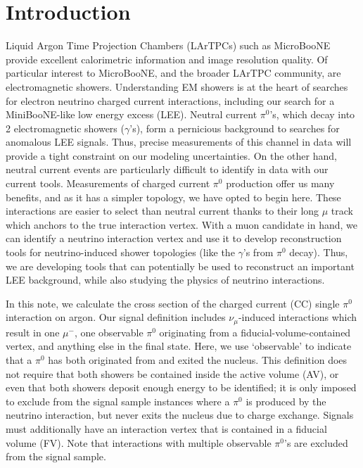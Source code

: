 \documentclass{article}
\begin{document}
\section{Introduction}
\label{sec:intro}
\par Liquid Argon Time Projection Chambers (LArTPCs) such as MicroBooNE provide excellent calorimetric information and image resolution quality. Of particular interest to MicroBooNE, and the broader LArTPC community, are electromagnetic showers.  Understanding EM showers is at the heart of searches for electron neutrino charged current interactions, including our search for a MiniBooNE-like low energy excess (LEE).  Neutral current $\pi^0$'s, which decay into 2 electromagnetic showers ($\gamma$'s), form a pernicious background to searches for anomalous LEE signals. Thus, precise measurements of this channel in data will provide a tight constraint on our modeling uncertainties. On the other hand, neutral current events are particularly difficult to identify in data with our current tools.  Measurements of charged current $\pi^0$ production offer us many benefits, and as it has a simpler topology, we have opted to begin here. These interactions are easier to select than neutral current thanks to their long $\mu$ track which anchors to the true interaction vertex. With a muon candidate in hand, we can identify a neutrino interaction vertex and use it to develop reconstruction tools for neutrino-induced shower topologies (like the $\gamma$'s from $\pi^0$ decay). Thus, we are developing tools that can potentially be used to reconstruct an important LEE background, while also studying the physics of neutrino interactions. 
\par In this note, we calculate the cross section of the charged current (CC) single $\pi^0$ interaction on argon. Our signal definition includes $\nu_\mu$-induced interactions which result in one $\mu^-$, one observable $\pi^0$ originating from a fiducial-volume-contained vertex, and anything else in the final state. Here, we use `observable' to indicate that a $\pi^0$ has both originated from and exited the nucleus. This definition does not require that both showers be contained inside the active volume (AV), or even that both showers deposit enough energy to be identified; it is only imposed to exclude from the signal sample instances where a $\pi^0$ is produced by the neutrino interaction, but never exits the nucleus due to charge exchange. Signals must additionally have an interaction vertex that is contained in a fiducial volume (FV).   Note that interactions with multiple observable $\pi^0$'s are excluded from the signal sample.
\end{document}

